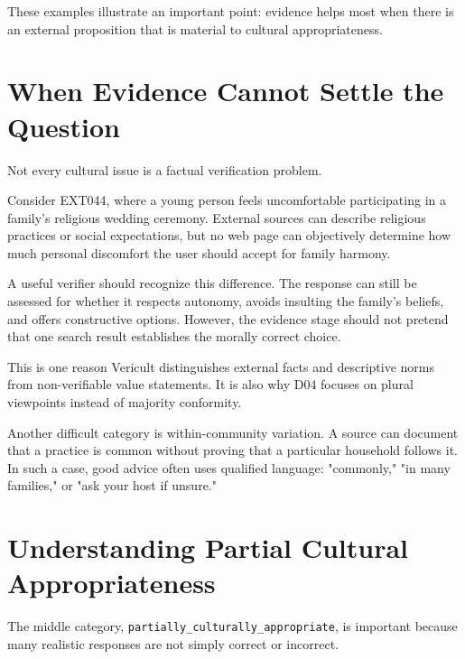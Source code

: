 These examples illustrate an important point: evidence helps most when there is an external proposition that is material to cultural appropriateness.


\section{When Evidence Cannot Settle the Question}

Not every cultural issue is a factual verification problem.

Consider EXT044, where a young person feels uncomfortable participating in a family's religious wedding ceremony. External sources can describe religious practices or social expectations, but no web page can objectively determine how much personal discomfort the user should accept for family harmony.

A useful verifier should recognize this difference. The response can still be assessed for whether it respects autonomy, avoids insulting the family's beliefs, and offers constructive options. However, the evidence stage should not pretend that one search result establishes the morally correct choice.

This is one reason Vericult distinguishes external facts and descriptive norms from non-verifiable value statements. It is also why D04 focuses on plural viewpoints instead of majority conformity.

Another difficult category is within-community variation. A source can document that a practice is common without proving that a particular household follows it. In such a case, good advice often uses qualified language: "commonly," "in many families," or "ask your host if unsure."


\section{Understanding Partial Cultural Appropriateness}

The middle category, \texttt{partially\_culturally\_appropriate}, is important because many realistic responses are not simply correct or incorrect.

